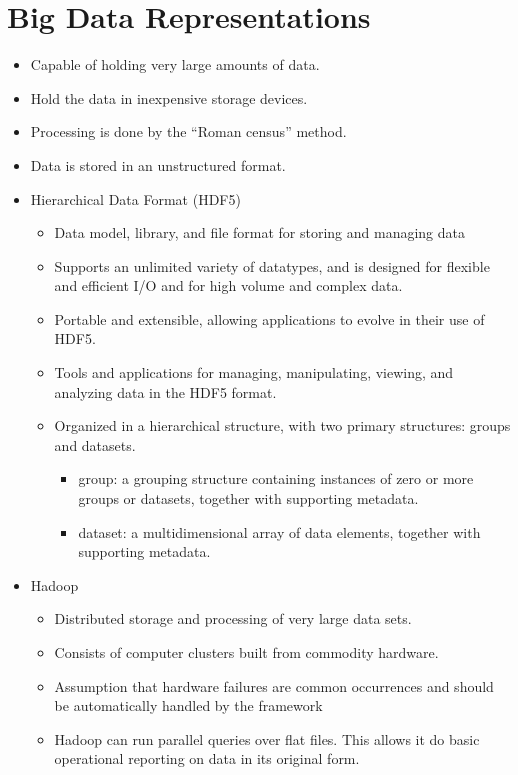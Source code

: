 \section{Big Data Representations}
\begin{itemize}
	\item Capable of holding very large amounts of data.
	\item Hold the data in inexpensive storage devices.
	\item Processing is done by the “Roman census” method.
	\item Data is stored in an unstructured format.
	\item Hierarchical Data Format (HDF5)
	\begin{itemize}
		\item Data model, library, and file format for storing and managing data
		\item Supports an unlimited variety of datatypes, and is designed for flexible and efficient I/O and for high volume and complex data. 
		\item Portable and extensible, allowing applications to evolve in their use of HDF5.
		\item Tools and applications for managing, manipulating, viewing, and analyzing data in the HDF5 format. 
		\item Organized in a hierarchical structure, with two primary structures: groups and datasets. 
		\begin{itemize}
			\item group: a grouping structure containing instances of zero or more groups or datasets, together with supporting metadata. 
			\item dataset: a multidimensional array of data elements, together with supporting metadata. 
		\end{itemize}
	\end{itemize}
	\item Hadoop
	\begin{itemize}
		\item Distributed storage and processing of very large data sets. 
		\item Consists of computer clusters built from commodity hardware.
		\item Assumption that hardware failures are common occurrences and should be automatically handled by the framework
		\item Hadoop can run parallel queries over flat files. This allows it do basic operational reporting on data in its original form.

\end{itemize}
\end{itemize}
